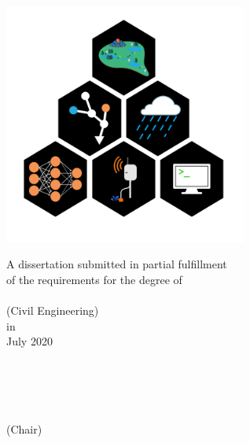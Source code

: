 \begin{titlepage}
    \begin{addmargin}[-1cm]{-3cm}
    \begin{center}
        \large

        \hfill

        \vfill

        \begingroup
            \color{CTtitle}\spacedallcaps{\myTitle} \\ \bigskip
        \endgroup

        \spacedlowsmallcaps{\myName}

        \vfill

        \includegraphics[width=8cm]{gfx/title_page.png} \\ \medskip

	\medskip
	\small{A dissertation submitted in partial fulfillment\\
	of the requirements for the degree of \\
        \myDegree \\
	(Civil Engineering)\\
        in \myUni \\
July 2020 \\}

	\bigskip
	
	\\
	\myFaculty\\
	\myProf \\
	\myOtherProf \\
	\mySupervisor (Chair)\\


        \vfill

    \end{center}
  \end{addmargin}
\end{titlepage}
